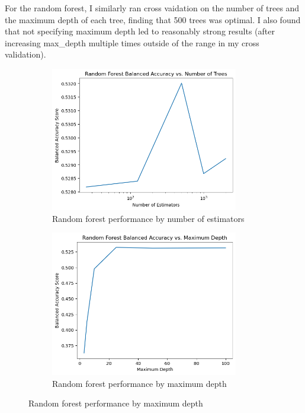 \documentclass[12pt]{article}
\newtheorem{Proof of Lemma}{Proof of Lemma}
\begin{document}
For the random forest, I similarly ran cross vaidation on the number of trees and the maximum depth of each tree, finding that 500 trees was optimal. I also found that not specifying maximum depth led to reasonably strong results (after increasing max\_depth multiple times outside of the range in my cross validation).

\begin{figure}[H]
	\begin{subfigure}{.5\textwidth}
		\includegraphics*[width=0.9\textwidth]{../figures/rf_estimators.png}
		\caption*{Random forest performance by number of estimators}
	\end{subfigure}%
	\begin{subfigure}{.5\textwidth}
		\includegraphics*[width=0.9\textwidth]{../figures/rf_maxdepth.png}
		\caption*{Random forest performance by maximum depth}
	\end{subfigure}%
\end{figure}
\end{document}
